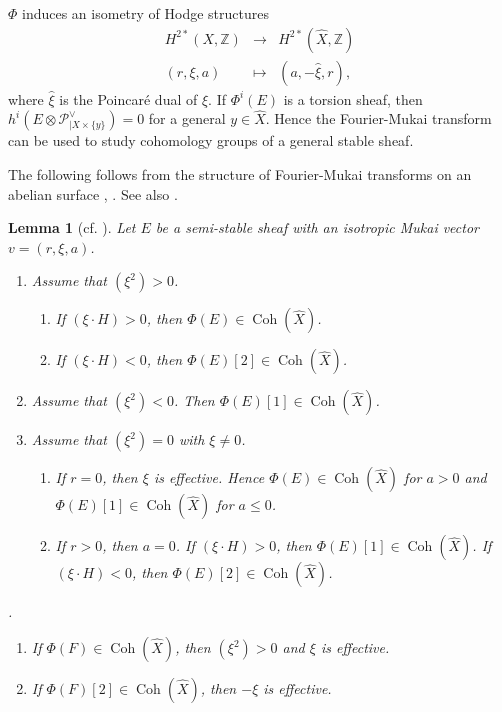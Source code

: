 \documentclass[10pt]{amsart}
\def\cal{\mathcal}
\def\Bbb{\mathbb}
\newenvironment{NB}{
\color{red}{\bf NB}. \footnotesize 
}{}
\newcommand{\Coh}{\operatorname{Coh}}
\numberwithin{equation}{section}
\theoremstyle{plain}
\newtheorem{lem}[thm]{Lemma}
\theoremstyle{definition}
\theoremstyle{remark}
\begin{document}
$\Phi$ induces an isometry of Hodge structures
\begin{equation}
\begin{matrix}
H^{2*}(X,{\Bbb Z}) & \to & H^{2*}(\widehat{X},{\Bbb Z})\\
(r,\xi,a) & \mapsto & (a,-\widehat{\xi},r),
\end{matrix}
\end{equation}
where $\widehat{\xi}$ is the Poincar\'{e} dual of $\xi$.
If $\Phi^i(E)$ is a torsion sheaf, then
$h^i(E \otimes {\cal P}_{|X \times \{ y \}}^{\vee})=0$
for a general $y \in \widehat{X}$.
Hence the Fourier-Mukai transform can be used to study
cohomology groups of a general stable sheaf.


The following follows from the structure of Fourier-Mukai transforms
on an abelian surface \cite{BM}, \cite{Or1}. See also \cite[Prop. 4.4]{Y:abel}.
\begin{lem}[{cf. \cite[Lem. 2.9]{CNY2}}]\label{lem:semihom}
Let $E$ be a semi-stable sheaf with an isotropic Mukai vector $v=(r,\xi,a)$.
\begin{enumerate}
\item[(1)]
Assume that $(\xi^2)>0$. 
\begin{enumerate}
\item
If $(\xi \cdot H)>0$, then $\Phi(E) \in \Coh(\widehat{X})$. 
\item
If $(\xi \cdot H)<0$, then $\Phi(E)[2] \in \Coh(\widehat{X})$.
\end{enumerate}
\item[(2)]
Assume that $(\xi^2)<0$. Then $\Phi(E)[1] \in \Coh(\widehat{X})$. 
\item[(3)]
Assume that $(\xi^2)=0$ with $\xi \ne 0$.
\begin{enumerate}
\item
If $r=0$, then $\xi$ is effective.
Hence $\Phi(E) \in \Coh(\widehat{X})$ for $a> 0$
and $\Phi(E)[1] \in \Coh(\widehat{X})$ for $a \leq 0$.
\item 
If $r>0$, then $a=0$. If $(\xi \cdot H)>0$, then
$\Phi(E)[1] \in \Coh(\widehat{X})$. 
If $(\xi \cdot H)<0$, then
$\Phi(E)[2] \in \Coh(\widehat{X})$. 
\end{enumerate} 
\end{enumerate}
\begin{NB}
\begin{enumerate}
\item
If $\Phi(F) \in \Coh(\widehat{X})$, then
$(\xi^2)>0$ and
$\xi$ is effective. 
\item
If $\Phi(F)[2] \in \Coh(\widehat{X})$, then
$-\xi$ is effective. 
 \end{enumerate} 
\end{NB}
\end{lem}
\end{document}
